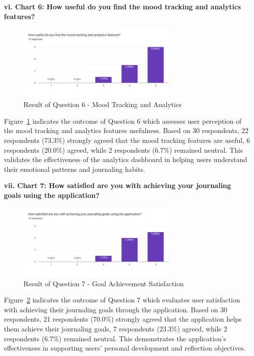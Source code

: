 \textbf{vi. Chart 6: How useful do you find the mood tracking and analytics features?}

\begin{figure}[H]
\centering
\includegraphics[width=0.7\textwidth]{files/imgs/survey/chart6_mood_analytics.png}
\caption{Result of Question 6 - Mood Tracking and Analytics}
\label{fig:chart6-mood}
\end{figure}

Figure~\ref{fig:chart6-mood} indicates the outcome of Question 6 which assesses user perception of the mood tracking and analytics features usefulness. Based on 30 respondents, 22 respondents (73.3\%) strongly agreed that the mood tracking features are useful, 6 respondents (20.0\%) agreed, while 2 respondents (6.7\%) remained neutral. This validates the effectiveness of the analytics dashboard in helping users understand their emotional patterns and journaling habits.

\textbf{vii. Chart 7: How satisfied are you with achieving your journaling goals using the application?}

\begin{figure}[H]
\centering
\includegraphics[width=0.7\textwidth]{files/imgs/survey/chart7_goal_achievement.png}
\caption{Result of Question 7 - Goal Achievement Satisfaction}
\label{fig:chart7-goals}
\end{figure}

Figure~\ref{fig:chart7-goals} indicates the outcome of Question 7 which evaluates user satisfaction with achieving their journaling goals through the application. Based on 30 respondents, 21 respondents (70.0\%) strongly agreed that the application helps them achieve their journaling goals, 7 respondents (23.3\%) agreed, while 2 respondents (6.7\%) remained neutral. This demonstrates the application's effectiveness in supporting users' personal development and reflection objectives.

